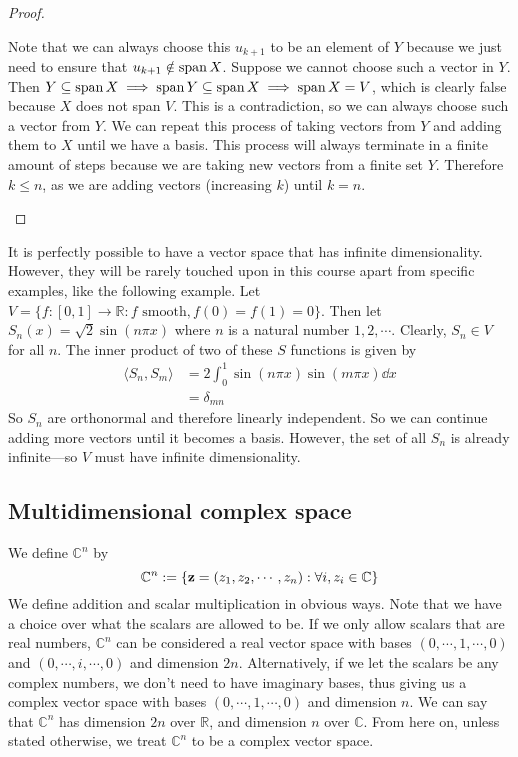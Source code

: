 \begin{proof}
\begin{enumerate}
		      Note that we can always choose this \(u_{k+1}\) to be an element of \(Y\) because we just need to ensure that \(u_{k+1} \notin \operatorname{span} X\).
		      Suppose we cannot choose such a vector in \(Y\).
		      Then \(Y \subseteq \operatorname{span} X \implies \operatorname{span} Y \subseteq \operatorname{span} X \implies \operatorname{span} X = V\), which is clearly false because \(X\) does not span \(V\).
		      This is a contradiction, so we can always choose such a vector from \(Y\).
		      We can repeat this process of taking vectors from \(Y\) and adding them to \(X\) until we have a basis.
		      This process will always terminate in a finite amount of steps because we are taking new vectors from a finite set \(Y\).
		      Therefore \(k \leq n\), as we are adding vectors (increasing \(k\)) until \(k=n\).
	\end{enumerate}
\end{proof}

It is perfectly possible to have a vector space that has infinite dimensionality.
However, they will be rarely touched upon in this course apart from specific examples, like the following example.
Let \(V = \{ f: [0, 1] \to \mathbb R: f \text{ smooth}, f(0) = f(1) = 0\}\).
Then let \(S_n(x) = \sqrt 2 \sin(n \pi x)\) where \(n\) is a natural number \(1, 2, \cdots\).
Clearly, \(S_n \in V\) for all \(n\).
The inner product of two of these \(S\) functions is given by
\begin{align*}
	\langle S_n, S_m \rangle & = 2 \int_0^1 \sin(n \pi x) \sin(m \pi x) \dd{x} \\
	                         & = \delta_{mn}
\end{align*}
So \(S_n\) are orthonormal and therefore linearly independent.
So we can continue adding more vectors until it becomes a basis.
However, the set of all \(S_n\) is already infinite---so \(V\) must have infinite dimensionality.

\subsection{Multidimensional complex space}
We define \(\mathbb C^n\) by
\[
	\mathbb C^n := \{ \vb z = (z_1, z_2, \cdots, z_n): \forall i, z_i \in \mathbb C \}
\]
We define addition and scalar multiplication in obvious ways.
Note that we have a choice over what the scalars are allowed to be.
If we only allow scalars that are real numbers, \(\mathbb C^n\) can be considered a real vector space with bases \((0, \cdots, 1, \cdots, 0)\) and \((0, \cdots, i, \cdots, 0)\) and dimension \(2n\).
Alternatively, if we let the scalars be any complex numbers, we don't need to have imaginary bases, thus giving us a complex vector space with bases \((0, \cdots, 1, \cdots, 0)\) and dimension \(n\).
We can say that \(\mathbb C^n\) has dimension \(2n\) over \(\mathbb R\), and dimension \(n\) over \(\mathbb C\).
From here on, unless stated otherwise, we treat \(\mathbb C^n\) to be a complex vector space.

